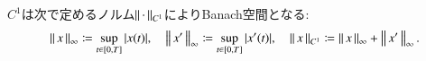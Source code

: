\begin{comment}
\begin{prf}\mbox{}
	\begin{description}
		\item[(1)] 
			各$k,j$に対して
			\begin{align}
				\int_s^u f^k_j(x_r)\ dx^j_r
				+ \int_u^t f^k_j(x_r)\ dx^j_r
				= \int_s^t f^k_j(x_r)\ dx^j_r
				\label{eq:thm_linearity_of_Riemann_Stieltjes_integral_1}
			\end{align}
			が成り立つことを示せばよい．
			以下，分割$D$に対するRiemann和$\sum_D f^k_j(x_{t_{i-1}})(x^j_{t_i} - x^j_{t_{i-1}})$を$\Sigma_D$と略記する．
			定理\ref{thm:existence_of_Riemann_Stieltjes_integral}より，
			任意の$\epsilon > 0$に対して或る$\delta > 0$が存在し，
			\begin{align}
				|D_1|,|D_2|,|D_3| < \delta,
				\quad \left(D_1 \in \delta[s,u],\ D_2 \in \delta[u,t],\ D_3 \in \delta[s,t] \right)
			\end{align}
			である限り
			\begin{align}
				\left| \int_s^u f^k_j(x_r)\ dx^j_r - \Sigma_{D_1} \right| < \epsilon,
				\quad \left| \int_u^t f^k_j(x_r)\ dx^j_r - \Sigma_{D_2} \right| < \epsilon,
				\quad \left| \int_s^t f^k_j(x_r)\ dx^j_r - \Sigma_{D_3} \right| < \epsilon
			\end{align}
			が成立する．$|D_1|,|D_2| < \delta/2$を満たす
			$D_1,D_2$を取り$D_3$をその合併とすれば，$|D_3| < \delta$かつ
			\begin{align}
				\Sigma_{D_1} + \Sigma_{D_2} = \Sigma_{D_3}
			\end{align}
			が成り立ち，
			\begin{align}
				&\left| \int_s^u f^k_j(x_r)\ dx^j_r + \int_u^t f^k_j(x_r)\ dx^j_r
					- \int_s^t f^k_j(x_r)\ dx^j_r \right| \\
				&\qquad \leq \left| \int_s^u f^k_j(x_r)\ dx^j_r - \Sigma_{D_1} \right|
				+ \left| \int_u^t f^k_j(x_r)\ dx^j_r - \Sigma_{D_2} \right|
				+ \left| \int_s^t f^k_j(x_r)\ dx^j_r - \Sigma_{D_3} \right| \\
				&\qquad < 3\epsilon
			\end{align}
			が従い(\refeq{eq:thm_linearity_of_Riemann_Stieltjes_integral_1})を得る．
		
		\item[(2)] 略．
		\QED
	\end{description}
\end{prf}

\end{comment}
$C^1$は次で定めるノルム$\left\|\, \cdot\, \right\|_{C^1}$によりBanach空間となる:
\begin{align}
	\left\|\, x\, \right\|_{\infty} \coloneqq \operatorname*{sup}_{t \in [0,T]} |x(t)|,
	\quad \left\|\, x'\, \right\|_{\infty} \coloneqq \operatorname*{sup}_{t \in [0,T]} |x'(t)|,
	\quad \left\|\, x\, \right\|_{C^1} \coloneqq
	\left\|\, x\, \right\|_{\infty} + \left\|\, x'\, \right\|_{\infty}.
\end{align}

